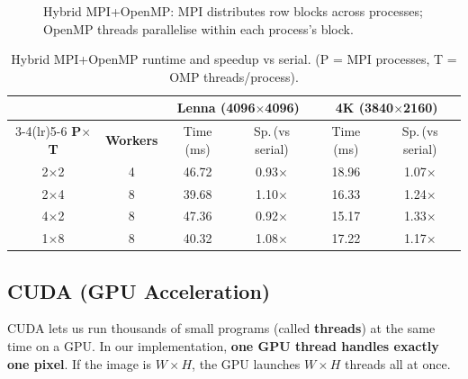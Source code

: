 \documentclass[12pt,a4paper]{article}
\begin{document}
\begin{figure}[H]
{
}%
\caption{Hybrid MPI+OpenMP: MPI distributes row blocks across processes;
  OpenMP threads parallelise within each process's block.}
\label{fig:diag_hybrid}
\end{figure}

\begin{table}[H]
\centering\small
\setlength{\tabcolsep}{5pt}
\begin{tabular}{@{}cc cc cc@{}}
\toprule
 & & \multicolumn{2}{c}{\textbf{Lenna (4096$\times$4096)}} &
     \multicolumn{2}{c}{\textbf{4K (3840$\times$2160)}} \\
\cmidrule(lr){3-4}\cmidrule(lr){5-6}
\textbf{P$\times$T} & \textbf{Workers} &
  Time (ms) & Sp.\,(vs serial) & Time (ms) & Sp.\,(vs serial) \\
\midrule
2$\times$2 & 4 & 46.72 & 0.93$\times$ & 18.96 & 1.07$\times$ \\
2$\times$4 & 8 & 39.68 & 1.10$\times$ & 16.33 & 1.24$\times$ \\
4$\times$2 & 8 & 47.36 & 0.92$\times$ & 15.17 & 1.33$\times$ \\
1$\times$8 & 8 & 40.32 & 1.08$\times$ & 17.22 & 1.17$\times$ \\
\bottomrule
\end{tabular}
\caption{Hybrid MPI+OpenMP runtime and speedup vs serial.
  (P = MPI processes, T = OMP threads/process).}
\label{tab:t_hybrid}
\end{table}

\subsection{CUDA (GPU Acceleration)}
\label{subsec:cuda}

CUDA lets us run thousands of small programs (called \textbf{threads}) at the
same time on a GPU. In our implementation, \textbf{one GPU thread handles
exactly one pixel}. If the image is $W \times H$, the GPU launches
$W \times H$ threads all at once.
\end{document}
